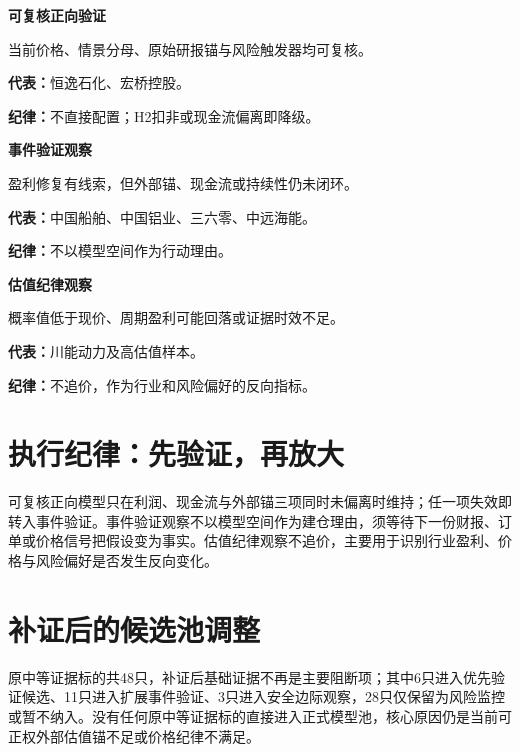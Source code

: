 \noindent
\begin{exhibitbox}
\begin{minipage}[t]{0.31\textwidth}
\textbf{\color{riskgreen}可复核正向验证}
\par\smallskip
当前价格、情景分母、原始研报锚与风险触发器均可复核。
\par\smallskip
\textbf{代表：}恒逸石化、宏桥控股。
\par\smallskip
\textbf{纪律：}不直接配置；H2扣非或现金流偏离即降级。
\end{minipage}\hfill
\begin{minipage}[t]{0.31\textwidth}
\textbf{\color{riskamber}事件验证观察}
\par\smallskip
盈利修复有线索，但外部锚、现金流或持续性仍未闭环。
\par\smallskip
\textbf{代表：}中国船舶、中国铝业、三六零、中远海能。
\par\smallskip
\textbf{纪律：}不以模型空间作为行动理由。
\end{minipage}\hfill
\begin{minipage}[t]{0.31\textwidth}
\textbf{\color{riskred}估值纪律观察}
\par\smallskip
概率值低于现价、周期盈利可能回落或证据时效不足。
\par\smallskip
\textbf{代表：}川能动力及高估值样本。
\par\smallskip
\textbf{纪律：}不追价，作为行业和风险偏好的反向指标。
\end{minipage}
\end{exhibitbox}

\section{执行纪律：先验证，再放大}

可复核正向模型只在利润、现金流与外部锚三项同时未偏离时维持；任一项失效即转入事件验证。事件验证观察不以模型空间作为建仓理由，须等待下一份财报、订单或价格信号把假设变为事实。估值纪律观察不追价，主要用于识别行业盈利、价格与风险偏好是否发生反向变化。

\section{补证后的候选池调整}

原中等证据标的共48只，补证后基础证据不再是主要阻断项；其中6只进入优先验证候选、11只进入扩展事件验证、3只进入安全边际观察，28只仅保留为风险监控或暂不纳入。没有任何原中等证据标的直接进入正式模型池，核心原因仍是当前可正权外部估值锚不足或价格纪律不满足。


